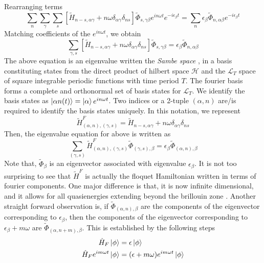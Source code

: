 Rearranging terms
\begin{equation*}
\sum_{n}\sum_{\gamma}\sum_{s}{[\tilde{H}_{n-s,\alpha\gamma} + n\omega\delta_{\alpha\gamma}\delta_{ns}]\tilde{\Phi}_{s,\gamma\beta}e^{in\omega t}e^{-i\epsilon_\beta t}}
 = \sum_{n}{\epsilon_\beta \tilde{\Phi}_{n,\alpha\beta}e^{-i\epsilon_\beta t}}
\end{equation*}
Matching coefficients of the $e^{in\omega t}$, we obtain
\begin{equation}
 \sum_{\gamma, s}{[\tilde{H}_{n-s,\alpha\gamma} + n\omega\delta_{\alpha\gamma}\delta_{ns}]\tilde{\Phi}_{s,\gamma\beta}} = \epsilon_\beta \tilde{\Phi}_{n,\alpha\beta}
\end{equation}
The above equation is an eigenvalue written the \emph{Sambe space} \cite{sambe1973steady, anisimovas2015high, shirley1965solution}, in a basis constituting states from the direct product of hilbert space $\mathcal{H}$ and 
the $\mathcal{L}_{T}$ space of square integrable periodic functions with time period $T$. 
The fourier basis forms a complete and orthonormal set of basis states for $\mathcal{L}_{T}$. We identify the basis states as $\ket{\alpha n(t)} = \ket{\alpha}e^{in\omega t}$.
Two indices or a 2-tuple $(\alpha, n)$ are/is required to identify the basis states uniquely. In this notation, we represent
\begin{equation}
 \tilde{H}^{F}_{(\alpha,n), (\gamma, s)} = \tilde{H}_{n-s,\alpha\gamma} + n\omega\delta_{\alpha\gamma}\delta_{ns}
\end{equation}
Then, the eigenvalue equation for above is written as
\begin{equation}
 \sum_{(\gamma, s)}{\tilde{H}^{F}_{(\alpha,n), (\gamma, s)}\tilde{\Phi}_{(\gamma,s), \beta}} = \epsilon_\beta\tilde{\Phi}_{(\alpha,n), \beta}
\end{equation} Note that, $\tilde{\Phi}_{\beta}$ is an eigenvector associated with eigenvalue $\epsilon_\beta$.
It is not too surprising to see that $\tilde{H}^{F}$ is actually the floquet Hamiltonian written in terms of fourier components. One major difference is that, it is
now infinite dimensional, and it allows for all quasienergies extending beyond the brillouin zone \cite{shirley1965solution, anisimovas2015high}. Another straight forward
observation is, if $\tilde{\Phi}_{(\alpha,n), \beta}$ are the components of the eigenvector corresponding to $\epsilon_\beta$, then the components of the eigenvector corresponding
to $\epsilon_\beta + m\omega$ are $\tilde{\Phi}_{(\alpha,n+m), \beta}$. This is established by the following steps
\begin{align*}
 \hat{H}_{F}\ket{\phi} &= \epsilon\ket{\phi} \\
 \hat{H}_{F}e^{im\omega t}\ket{\phi} &= (\epsilon+m\omega)e^{im\omega t}\ket{\phi}
\end{align*} 


